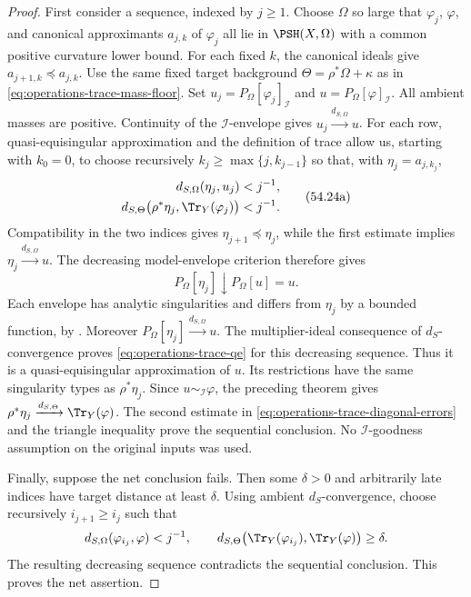 \begin{proof}
First consider a sequence, indexed by $j\geq1$.
Choose $\Omega$ so large that $\varphi_j$, $\varphi$, and canonical
approximants $a_{j,k}$ of $\varphi_j$ all lie in
$\PSH(X,\Omega)$ with a common positive curvature lower bound.
For each fixed $k$, the canonical ideals give
$a_{j+1,k}\preceq a_{j,k}$.
Use the same fixed target background
$\Theta=\rho^*\Omega+\kappa$ as in
\eqref{eq:operations-trace-mass-floor}.
Set
$u_j=P_\Omega[\varphi_j]_{\mathcal I}$ and
$u=P_\Omega[\varphi]_{\mathcal I}$.
All ambient masses are positive.  Continuity of the
$\mathcal I$-envelope \cite[Theorem~6.2.3]{XiaBook} gives
$u_j\xrightarrow{d_{S,\Omega}}u$.
For each row, quasi-equisingular approximation and the definition of
trace allow us, starting with $k_0=0$, to choose recursively
$k_j\geq\max\{j,k_{j-1}\}$ so that, with $\eta_j=a_{j,k_j}$,
\[
 \begin{split}
 d_{S,\Omega}(\eta_j,u_j)&<j^{-1},\\
 d_{S,\Theta}\bigl(\rho^*\eta_j,\Tr_Y(\varphi_j)\bigr)&<j^{-1}.
 \end{split}
\tag{54.24a}\label{eq:operations-trace-diagonal-errors}
\]
Compatibility in the two indices gives
$\eta_{j+1}\preceq\eta_j$, while the first estimate implies
$\eta_j\xrightarrow{d_{S,\Omega}}u$.
The decreasing model-envelope criterion
\cite[Proposition~6.2.6]{XiaBook} therefore gives
\[
             P_\Omega[\eta_j]\downarrow P_\Omega[u]=u.
\tag{54.24b}\label{eq:operations-trace-diagonal-envelope}
\]
Each envelope has analytic singularities and differs from $\eta_j$
by a bounded function, by \cite[Proposition~3.2.10]{XiaBook}.
Moreover $P_\Omega[\eta_j]\xrightarrow{d_{S,\Omega}}u$.
The multiplier-ideal consequence of $d_S$-convergence
\cite[Theorem~6.2.6]{XiaBook} proves
\eqref{eq:operations-trace-qe} for this decreasing sequence.
Thus it is a quasi-equisingular approximation of $u$.
Its restrictions have the same singularity types as $\rho^*\eta_j$.
Since $u\sim_{\mathcal I}\varphi$, the preceding theorem gives
$\rho^*\eta_j\xrightarrow{d_{S,\Theta}}\Tr_Y(\varphi)$.
The second estimate in \eqref{eq:operations-trace-diagonal-errors}
and the triangle inequality prove the sequential conclusion.
No $\mathcal I$-goodness assumption on the original inputs was used.

Finally, suppose the net conclusion fails.  Then some $\delta>0$
and arbitrarily late indices have target distance at least $\delta$.
Using ambient $d_S$-convergence, choose recursively
$i_{j+1}\geq i_j$ such that
\[
 d_{S,\Omega}(\varphi_{i_j},\varphi)<j^{-1},\qquad
 d_{S,\Theta}\bigl(\Tr_Y(\varphi_{i_j}),\Tr_Y(\varphi)\bigr)
 \geq\delta.
\]
The resulting decreasing sequence contradicts the sequential
conclusion.  This proves the net assertion.
\end{proof}

